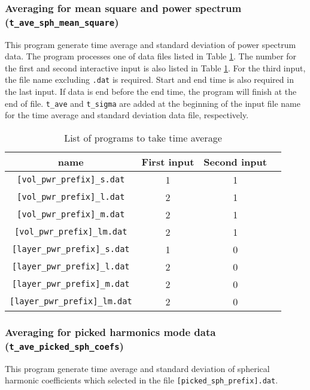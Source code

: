 \subsubsection{Averaging for mean square and power spectrum \\
 ({\tt t\_ave\_sph\_mean\_square})}
\label{sec:ave_mean_square}
This program generate time average and standard deviation of power spectrum data. The program processes one of data files listed in Table \ref{table:time_averages_sprectr}. The number for the first and second interactive input is also listed in Table \ref{table:time_averages_sprectr}. For the third input, the file name excluding \verb|.dat| is required. Start and end time is also required in the last input. If data is end before the end time, the program will finish at the end of file. \verb|t_ave| and \verb|t_sigma| are added at the beginning of the input file name for the time average and standard deviation data file, respectively.
%
\begin{table}[htp]
\caption{List of programs to take time average}
\begin{center} 
\begin{tabular}{|c|c|c|c|}
\hline
 name & First input & Second input \\ \hline \hline
\verb|[vol_pwr_prefix]_s.dat| & 1 & 1 \\ \hline
\verb|[vol_pwr_prefix]_l.dat| & 2 & 1 \\
\verb|[vol_pwr_prefix]_m.dat| & 2 & 1 \\
\verb|[vol_pwr_prefix]_lm.dat| & 2 & 1 \\ \hline
\verb|[layer_pwr_prefix]_s.dat| & 1 & 0  \\ \hline
\verb|[layer_pwr_prefix]_l.dat| & 2 & 0 \\
\verb|[layer_pwr_prefix]_m.dat| & 2 & 0 \\
\verb|[layer_pwr_prefix]_lm.dat| & 2 & 0 \\ \hline
\end{tabular}
\end{center}
\label{table:time_averages_sprectr}
\end{table}
%

\subsubsection{Averaging for picked harmonics mode data \\
 ({\tt t\_ave\_picked\_sph\_coefs})}
\label{sec:ave_picked_spectr}
This program generate time average and standard deviation of spherical harmonic coefficients which selected in the file \verb|[picked_sph_prefix].dat|.

